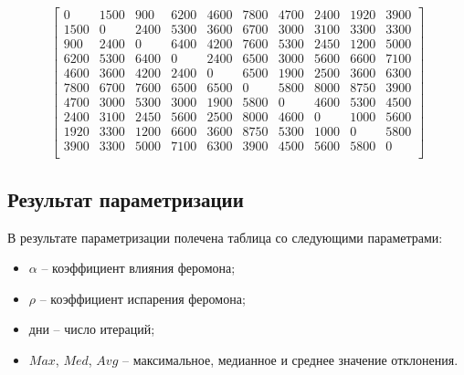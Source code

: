 \[
    \begin{bmatrix}
        0    & 1500 & 900  & 6200 & 4600 & 7800 & 4700 & 2400 & 1920 & 3900 \\
        1500 & 0    & 2400 & 5300 & 3600 & 6700 & 3000 & 3100 & 3300 & 3300 \\
        900  & 2400 & 0    & 6400 & 4200 & 7600 & 5300 & 2450 & 1200 & 5000 \\
        6200 & 5300 & 6400 & 0    & 2400 & 6500 & 3000 & 5600 & 6600 & 7100 \\
        4600 & 3600 & 4200 & 2400 & 0    & 6500 & 1900 & 2500 & 3600 & 6300 \\
        7800 & 6700 & 7600 & 6500 & 6500 & 0    & 5800 & 8000 & 8750 & 3900 \\
        4700 & 3000 & 5300 & 3000 & 1900 & 5800 & 0    & 4600 & 5300 & 4500 \\
        2400 & 3100 & 2450 & 5600 & 2500 & 8000 & 4600 & 0    & 1000 & 5600 \\
        1920 & 3300 & 1200 & 6600 & 3600 & 8750 & 5300 & 1000 & 0    & 5800 \\
        3900 & 3300 & 5000 & 7100 & 6300 & 3900 & 4500 & 5600 & 5800 & 0    \\
    \end{bmatrix}
\]

\subsection{Результат параметризации}

В результате параметризации полечена таблица со следующими параметрами:
\begin{itemize}
    \item $\alpha$ -- коэффициент влияния феромона;
    \item $\rho$ -- коэффициент испарения феромона;
    \item дни -- число итераций;
    \item $Max$, $Med$, $Avg$ -- максимальное, медианное и среднее значение отклонения.
\end{itemize}

